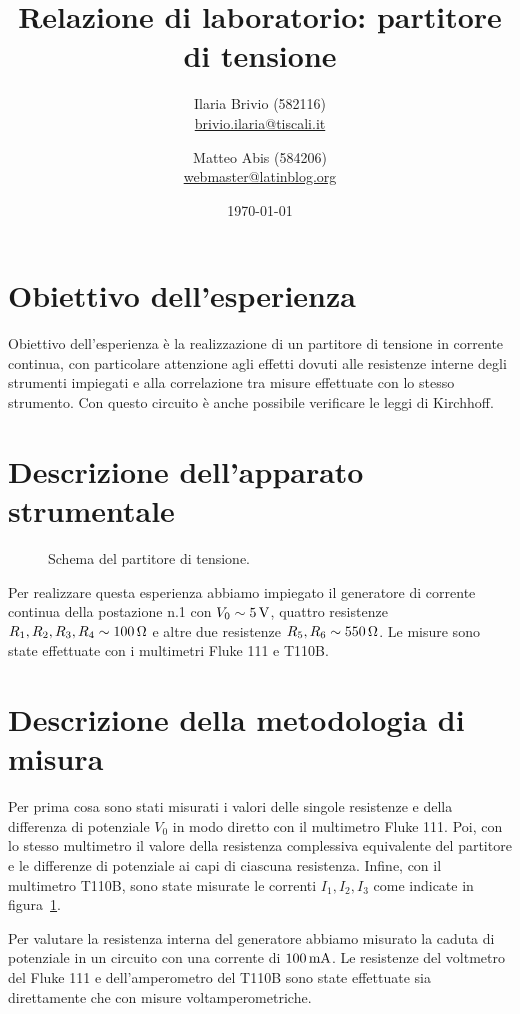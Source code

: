\documentclass[italian,a4paper]{article}
\begin{document}
\title{Relazione di laboratorio: partitore di tensione}
\author{\normalsize Ilaria Brivio (582116)\\%
\normalsize \url{brivio.ilaria@tiscali.it}%
\and %
\normalsize Matteo Abis (584206)\\ %
\normalsize \url{webmaster@latinblog.org}}
\date{\today}
\maketitle
\section{Obiettivo dell'esperienza}
Obiettivo dell'esperienza è la realizzazione di un partitore di tensione in corrente continua, con particolare attenzione agli effetti dovuti alle resistenze interne degli strumenti impiegati e alla correlazione tra misure effettuate con lo stesso strumento. Con questo circuito è anche possibile verificare le leggi di Kirchhoff.

\section{Descrizione dell'apparato strumentale}
\begin{figure}[h]\caption{Schema del partitore di tensione.}\label{part}
\centering
 
\end{figure}
\noindent Per realizzare questa esperienza abbiamo impiegato il generatore di corrente continua della postazione n.1 con $V_0 \sim \unit[5]{V}$, quattro resistenze $R_1,R_2, R_3, R_4 \sim \unit[100]{\ohm}$ e altre due resistenze $R_5, R_6 \sim \unit[550]{\ohm}$. Le misure sono state effettuate con i multimetri Fluke 111 e T110B.

\section{Descrizione della metodologia di misura}
Per prima cosa sono stati misurati i valori delle singole resistenze e della differenza di potenziale $V_0$ in modo diretto con il multimetro Fluke 111. Poi, con lo stesso multimetro il valore della resistenza complessiva equivalente del partitore e le differenze di potenziale ai capi di ciascuna resistenza. Infine, con il multimetro T110B, sono state misurate le correnti $I_1, I_2, I_3$ come indicate in figura~\ref{part}.

Per valutare la resistenza interna del generatore abbiamo misurato la caduta di potenziale in un circuito con una corrente di $\unit[100]{mA}$. Le resistenze del voltmetro del Fluke 111 e dell'amperometro del T110B sono state effettuate sia direttamente che con misure voltamperometriche.
\end{document}
